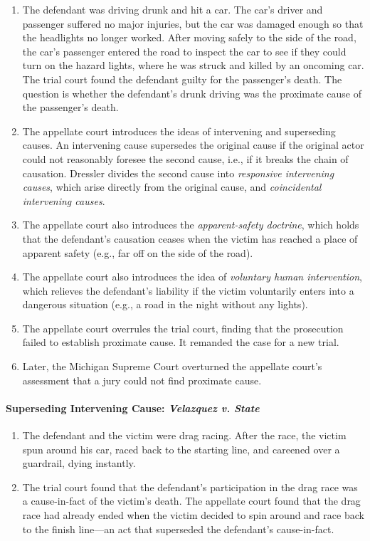 \begin{enumerate}
    \item The defendant was driving drunk and hit a car. The car's driver and passenger suffered no major injuries, but the car was damaged enough so that the headlights no longer worked. After moving safely to the side of the road, the car's passenger entered the road to inspect the car to see if they could turn on the hazard lights, where he was struck and killed by an oncoming car. The trial court found the defendant guilty for the passenger's death. The question is whether the defendant's drunk driving was the proximate cause of the passenger's death.
    \item The appellate court introduces the ideas of intervening and superseding causes. An intervening cause supersedes the original cause if the original actor could not reasonably foresee the second cause, i.e., if it breaks the chain of causation. Dressler divides the second cause into \emph{responsive intervening causes}, which arise directly from the original cause, and \emph{coincidental intervening causes}.
    \item The appellate court also introduces the \emph{apparent-safety doctrine}, which holds that the defendant's causation ceases when the victim has reached a place of apparent safety (e.g., far off on the side of the road).
    \item The appellate court also introduces the idea of \emph{voluntary human intervention}, which relieves the defendant's liability if the victim voluntarily enters into a dangerous situation (e.g., a road in the night without any lights).
    \item The appellate court overrules the trial court, finding that the prosecution failed to establish proximate cause. It remanded the case for a new trial.
    \item Later, the Michigan Supreme Court overturned the appellate court's assessment that a jury could not find proximate cause.
\end{enumerate}

\paragraph{Superseding Intervening Cause: \emph{Velazquez v. State}}

\begin{enumerate}
    \item The defendant and the victim were drag racing. After the race, the victim spun around his car, raced back to the starting line, and careened over a guardrail, dying instantly.
    \item The trial court found that the defendant's participation in the drag race was a cause-in-fact of the victim's death. The appellate court found that the drag race had already ended when the victim decided to spin around and race back to the finish line---an act that superseded the defendant's cause-in-fact.
\end{enumerate}
